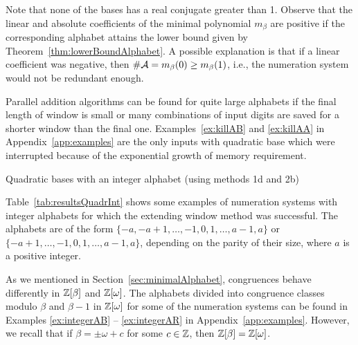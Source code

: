 Note that none of the bases has a real conjugate greater than 1. Observe that the linear and absolute coefficients of the minimal polynomial $m_\beta$ are positive if the corresponding alphabet attains the lower bound given by Theorem~\ref{thm:lowerBoundAlphabet}. A possible explanation is that if a linear coefficient was negative, then $\#\mathcal{A}=m_\beta(0)\geq m_\beta(1)$, i.e., the numeration system would not be redundant  enough.

Parallel addition algorithms can be found for quite large alphabets  if the final length of window is small or many combinations of input digits  are saved for a shorter window than the final one. Examples~\ref{ex:killAB} and \ref{ex:killAA} in Appendix~\ref{app:examples} are the only inputs with quadratic base which were interrupted because of the exponential growth of memory requirement.

 
\begin{table}[htpb]
	\begin{center}
	
	\end{center}
\caption{Quadratic bases with an integer alphabet (using methods 1d and 2b)}
\label{tab:resultsQuadrInt}
\end{table}

Table~\ref{tab:resultsQuadrInt} shows some examples of numeration systems with integer alphabets for which the extending window method was successful. The alphabets are of the form $\{-a, -a+1, \dots, -1,0,1,\dots, a-1,a\}$ or $\{-a+1, \dots, -1,0,1,\dots, a-1,a\}$, depending on the parity of their size, where $a$ is a positive integer.

As we mentioned in Section~\ref{sec:minimalAlphabet}, congruences behave differently in $\mathbb{Z}[\beta]$ and $\mathbb{Z}[\omega]$. The alphabets divided into congruence classes modulo $\beta$ and $\beta-1$ in $\mathbb{Z}[\omega]$ for some of the numeration systems can be found in Examples \ref{ex:integerAB} -- \ref{ex:integerAR} in Appendix~\ref{app:examples}. However, we recall that if $\beta=\pm \omega+c$  for some $c\in\mathbb{Z}$, then $\mathbb{Z}[\beta]=\mathbb{Z}[\omega]$. 

